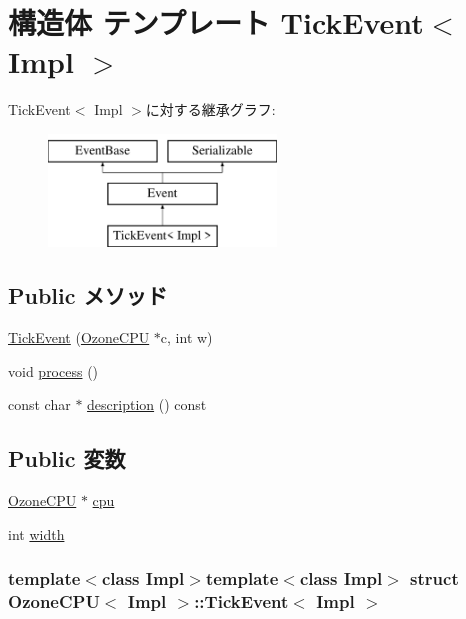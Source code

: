 \hypertarget{structOzoneCPU_1_1TickEvent}{
\section{構造体 テンプレート TickEvent$<$ Impl $>$}
\label{structOzoneCPU_1_1TickEvent}
}
TickEvent$<$ Impl $>$に対する継承グラフ:\begin{figure}[H]
\begin{center}
\leavevmode
\includegraphics[height=3cm]{structOzoneCPU_1_1TickEvent}
\end{center}
\end{figure}
\subsection*{Public メソッド}
\begin{DoxyCompactItemize}
\item 
\hyperlink{structOzoneCPU_1_1TickEvent_adb7ce54f621129f1b65634eb64fdbf26}{TickEvent} (\hyperlink{classOzoneCPU}{OzoneCPU} $\ast$c, int w)
\item 
void \hyperlink{structOzoneCPU_1_1TickEvent_a2e9c5136d19b1a95fc427e0852deab5c}{process} ()
\item 
const char $\ast$ \hyperlink{structOzoneCPU_1_1TickEvent_a5a14fe478e2393ff51f02e9b7be27e00}{description} () const 
\end{DoxyCompactItemize}
\subsection*{Public 変数}
\begin{DoxyCompactItemize}
\item 
\hyperlink{classOzoneCPU}{OzoneCPU} $\ast$ \hyperlink{structOzoneCPU_1_1TickEvent_a61b5f503eec141308b0cd6b4322b405b}{cpu}
\item 
int \hyperlink{structOzoneCPU_1_1TickEvent_a2474a5474cbff19523a51eb1de01cda4}{width}
\end{DoxyCompactItemize}
\subsubsection*{template$<$class Impl$>$template$<$class Impl$>$ struct OzoneCPU$<$ Impl $>$::TickEvent$<$ Impl $>$}



